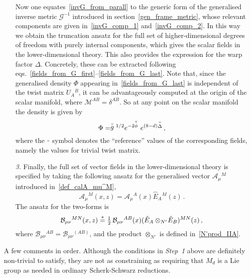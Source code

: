 \documentclass[debug]{phd}
\begin{document}
\begin{itemize}
									Now one equates~\eqref{invG_from_parall} to the generic form of the generalised inverse metric $\mathcal{G}^{-1}$ introduced in section~\ref{gen_frame_metric}, whose relevant components are given in~\eqref{invG_comp_1} and~\eqref{invG_comp_2}. 
									In this way we obtain the truncation ansatz for the full set of higher-dimensional degrees of freedom with purely internal components, which gives the scalar fields in the lower-dimensional theory. 
									This also provides the expression for the warp factor $\Delta$. 
									Concretely, these can be extracted following eqs.~\eqref{fields_from_G_first}--\eqref{fields_from_G_last}. 
									Note that, since the generalised density $\Phi$ appearing in~\eqref{fields_from_G_last} is independent of the twist matrix $U_A{}^B$, it can be advantageously computed at the origin of the scalar manifold, where $\mathcal{M}^{AB}=\delta^{AB}$. 
									So at any point on the scalar manifold the density is given by
											\begin{equation}\label{gen_density_background}
												\Phi = \stackrel{\scriptscriptstyle{\circ}}{g}{}^{1/2} e^{ -2 \stackrel{\scriptscriptstyle{\circ}}{\phi}} \ e^{(8-d)\stackrel{\scriptscriptstyle{\circ}}{\Delta}} \, ,
											\end{equation}
									where the {\large${\stackrel{\scriptscriptstyle{\circ}}{\,}}$} symbol denotes the ``reference'' values of the corresponding fields, namely the values for trivial twist matrix.
					\item[\textit{3.}]	Finally, the full set of vector fields in the lower-dimensional theory is specified by taking the following ansatz for the generalised vector $\mathcal{A}_\mu{}^M$ introduced in~\eqref{def_calA_mu^M},
											\begin{equation}\label{trunc_ansatz_vec}
												\mathcal{A}_\mu{}^M(x,z) = \mathcal{A}_\mu{}^A(x) \hat{E}_A{}^M(z) \, .
											\end{equation}
									The ansatz for the two-forms is
											\begin{equation}\label{ansatz_two-forms}
												\mathcal{B}_{\mu\nu}{}^{MN}(x,z) \stackrel{*}{=} \tfrac{1}{2}\,\mathcal{B}_{\mu\nu}{}^{AB}(x) (\hat{E}_A \otimes_{N'} \!\hat{E}_B)^{MN}(z)\,, 
											\end{equation}
									where $\mathcal{B}_{\mu\nu}{}^{AB} = \mathcal{B}_{\mu\nu}{}^{(AB)}$, and the product $\otimes_{N'}$ is defined in~\eqref{N'prod_IIA}.
					
					\end{itemize}
			A few comments in order. 
			Although the conditions in \emph{Step~1} above are definitely non-trivial to satisfy, they are not as constraining as requiring that $M_d$ is a Lie group as needed in ordinary Scherk-Schwarz reductions. 
\end{document}
